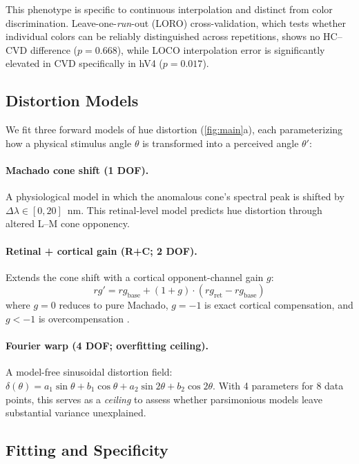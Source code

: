 \documentclass{article}
\begin{document}
This phenotype is specific to continuous interpolation and distinct from color discrimination.
Leave-one-\emph{run}-out (LORO) cross-validation, which tests whether individual colors can be reliably distinguished across repetitions, shows no HC--CVD difference ($p = 0.668$), while LOCO interpolation error is significantly elevated in CVD specifically in hV4 ($p = 0.017$).

\subsection{Distortion Models}

We fit three forward models of hue distortion (\cref{fig:main}a), each parameterizing how a physical stimulus angle $\theta$ is transformed into a perceived angle $\theta'$:

\paragraph{Machado cone shift (1 DOF).}
A physiological model \cite{placeholder_machado2009} in which the anomalous cone's spectral peak is shifted by $\Delta\lambda \in [0, 20]$~nm.
This retinal-level model predicts hue distortion through altered L--M cone opponency.

\paragraph{Retinal + cortical gain (R+C; 2 DOF).}
Extends the cone shift with a cortical opponent-channel gain $g$:
\begin{equation}
rg' = rg_{\text{base}} + (1{+}g) \cdot (rg_{\text{ret}} - rg_{\text{base}})
\label{eq:rc}
\end{equation}
where $g{=}0$ reduces to pure Machado, $g{=}{-}1$ is exact cortical compensation, and $g{<}{-}1$ is overcompensation \cite{placeholder_tregillus2021}.

\paragraph{Fourier warp (4 DOF; overfitting ceiling).}
A model-free sinusoidal distortion field: $\delta(\theta) = a_1\!\sin\theta + b_1\!\cos\theta + a_2\!\sin 2\theta + b_2\!\cos 2\theta$.
With 4 parameters for 8 data points, this serves as a \emph{ceiling} to assess whether parsimonious models leave substantial variance unexplained.

\subsection{Fitting and Specificity}
\end{document}
